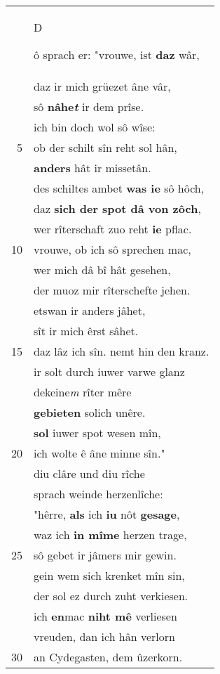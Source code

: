 \documentclass[8pt,a4paper,notitlepage]{article}
\begin{document}
\begin{table}[ht]
\begin{minipage}[t]{0.5\linewidth}
\begin{center}
\end{center}
\begin{tabular}{rl}
 & \begin{large}D\end{large}ô sprach er: "vrouwe, ist \textbf{daz} wâr,\\ 
 & daz ir mich grüezet âne vâr,\\ 
 & sô \textbf{nâhe\textit{t}} ir dem prîse.\\ 
 & ich bin doch wol sô wîse:\\ 
5 & ob der schilt sîn reht sol hân,\\ 
 & \textbf{anders} hât ir missetân.\\ 
 & des schiltes ambet \textbf{was ie} sô hôch,\\ 
 & daz \textbf{sich der spot dâ von zôch},\\ 
 & wer rîterschaft zuo reht \textbf{ie} pflac.\\ 
10 & vrouwe, ob ich sô sprechen mac,\\ 
 & wer mich dâ bî hât gesehen,\\ 
 & der muoz mir rîterschefte jehen.\\ 
 & etswan ir anders jâhet,\\ 
 & sît ir mich êrst sâhet.\\ 
15 & daz lâz ich sîn. nemt hin den kranz.\\ 
 & ir solt durch iuwer varwe glanz\\ 
 & dekeine\textit{m} rîter mêre\\ 
 & \textbf{gebieten} solich unêre.\\ 
 & \textbf{sol} iuwer spot wesen mîn,\\ 
20 & ich wolte ê âne minne sîn."\\ 
 & diu clâre und diu rîche\\ 
 & sprach weinde herzenlîche:\\ 
 & "hêrre, \textbf{als} ich \textbf{iu} nôt \textbf{gesage},\\ 
 & waz ich \textbf{in mîme} herzen trage,\\ 
25 & sô gebet ir jâmers mir gewin.\\ 
 & gein wem sich krenket mîn sin,\\ 
 & der sol ez durch zuht verkiesen.\\ 
 & ich \textbf{en}mac \textbf{niht mê} verliesen\\ 
 & vreuden, dan ich hân verlorn\\ 
30 & an Cydegasten, dem ûzerkorn.\\ 

\end{tabular}
\end{minipage}
\end{table}
\end{document}
